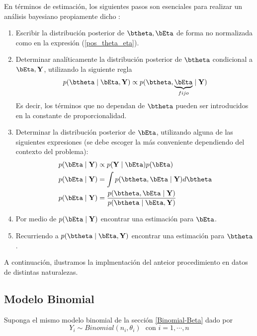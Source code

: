 En términos de estimación, los siguientes pasos son esenciales para realizar un análisis bayesiano propiamente dicho \cite{Gelman03}:

\begin{enumerate}
  \item Escribir la distribución posterior de $\btheta,\bEta$ de forma no normalizada como en la expresión (\ref{pos_theta_eta}).
  \item Determinar analíticamente la distribución posterior de $\btheta$ condicional a $\bEta,\mathbf{Y}$, utilizando la siguiente regla
      \begin{equation*}
      p(\btheta \mid \bEta,\mathbf{Y}) \propto p(\btheta,\underbrace{\bEta}_{fijo} \mid \mathbf{Y})
      \end{equation*}
      Es decir, los términos que no dependan de $\btheta$ pueden ser introducidos en la constante de proporcionalidad.
  \item Determinar la distribución posterior de $\bEta$, utilizando alguna de las siguientes expresiones (se debe escoger la más conveniente dependiendo del contexto del problema):
      \begin{align}
      p(\bEta \mid \mathbf{Y})&\propto p(\mathbf{Y} \mid \bEta)p(\bEta)\label{bEta1}\\
      p(\bEta \mid \mathbf{Y})&= \int p(\btheta, \bEta \mid \mathbf{Y}) d\btheta\label{bEta2}\\
      p(\bEta \mid \mathbf{Y})&= \frac{p(\btheta, \bEta \mid \mathbf{Y})}{p(\btheta \mid \bEta,\mathbf{Y})}\label{bEta3}
      \end{align}
  \item Por medio de $p(\bEta \mid \mathbf{Y})$ encontrar una estimación para $\bEta$.
  \item Recurriendo a  $p(\btheta \mid \bEta,\mathbf{Y})$ encontrar una estimación para $\btheta$.
\end{enumerate}

A continuación, ilustramos la implmentación del anteior procedimiento en datos de distintas naturalezas. 

\subsection{Modelo Binomial}
Suponga el mismo modelo binomial de la sección \ref{Binomial-Beta} dado por
\begin{equation*}
Y_i \sim Binomial(n_i,\theta_i)\ \ \ \text{con $i=1,\cdots,n$}
\end{equation*}

